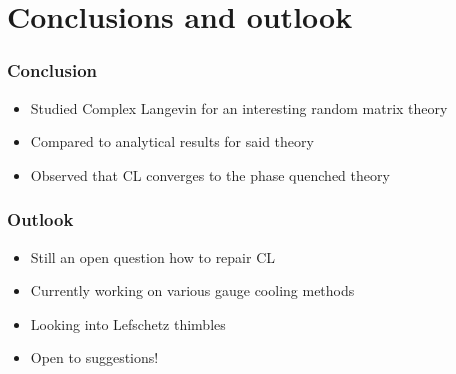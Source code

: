 \section{Conclusions and outlook}
\frame[plain]{\sectionpage}
\addtocounter{framenumber}{-1}

\begin{frame}
  \frametitle{Conclusion}

  \begin{itemize}
    \setlength\itemsep{1em}
    \item Studied Complex Langevin for an interesting random matrix theory
    \item Compared to analytical results for said theory
    \item Observed that CL converges to the phase quenched theory
  \end{itemize}
  
\end{frame}

\begin{frame}
  \frametitle{Outlook}

  \begin{itemize}
    \setlength\itemsep{1em}
    \item Still an open question how to {\color{Tropiteal}repair} CL
    \item Currently working on various gauge cooling methods
    \item Looking into Lefschetz thimbles
    \item Open to suggestions!
  \end{itemize}
  
\end{frame}
